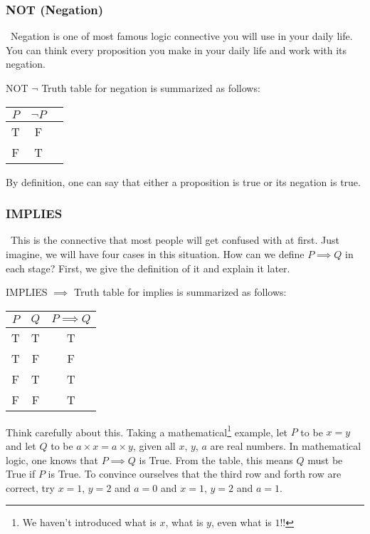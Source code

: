 \documentclass{article}
\begin{document}
\subsubsection{NOT (Negation)}
\quad\ Negation is one of most famous logic connective you will use in your daily life. You can think every proposition you make in
your daily life and work with its negation.
\begin{defin}{NOT $\neg$}
    Truth table for negation is summarized as follows:
\begin{center}
\begin{tabular}{|c|c|c|}
    \hline
    $P$ & $\neg P$ \\ \hline
    T   & F   \\ \hline
    F   & T  \\ \hline

\end{tabular}
\end{center}
\end{defin}
By definition, one can say that either a proposition is true or its negation is true.
\subsubsection{IMPLIES}
\quad\ This is the connective that most people will get confused with at first. Just imagine, we will
have four cases in this situation. How can we define $P\implies Q$ in each stage? First, we give
the definition of it and explain it later.
\begin{defin}{IMPLIES $\implies$}
    Truth table for implies is summarized as follows:
    \begin{center}
    \begin{tabular}{|c|c|c|}
        \hline
        $P$ & $Q$ & $P \implies Q$ \\ \hline
        T   & T  & T \\ \hline
        T   & F  & F \\ \hline
        F   & T  & T \\ \hline
        F   & F  & T \\ \hline
    \end{tabular}
    \end{center}
\end{defin}
Think carefully about this. Taking a mathematical\footnote{We haven't introduced what is $x$, what is $y$, even what is $1$!!} example,
let $P$ to be $x=y$ and let $Q$ to be $a\times x = a \times y$, given
all $x$, $y$, $a$ are real numbers. In mathematical logic, one knows that $P \implies Q$ is True. From the table, this means
$Q$ must be True if $P$ is True. To convince ourselves that the third row and forth row are correct, try $x = 1$, $y = 2$ and $a = 0$ and
$x = 1$, $y = 2$ and $a = 1$.
\end{document}
